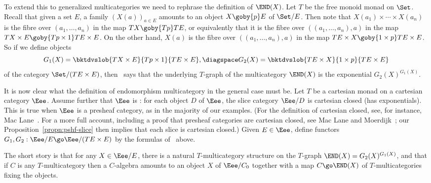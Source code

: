 To extend this to generalized multicategories we need to rephrase the
definition of $\END(X)$.  Let $T$ be the free monoid monad on $\Set$.
Recall that given a set $E$, a family $(X(a))_{a\in E}$ amounts to an
object $X \goby{p} E$ of $\Set/E$.  Then note that $X(a_1)
\times\cdots\times X(a_n)$ is the fibre over $(a_1, \ldots, a_n)$ in the
map $TX \goby{Tp} TE$, or equivalently that it is the fibre over $((a_1,
\ldots, a_n), a)$ in the map $TX \times E \goby{Tp \times 1} TE \times E$.
On the other hand, $X(a)$ is the fibre over $((a_1, \ldots, a_n), a)$ in
the map $TE \times X \goby{1 \times p} TE \times E$.  So if we define
objects
%
\begin{equation}	\label{eq:endo-graphs}
G_1(X) = \bktdvslob{TX \times E}{Tp \times 1}{TE \times E},
\diagspace
G_2(X) = \bktdvslob{TE \times X}{1 \times p}{TE \times E}
\end{equation}
%
of the category $\Set/(TE \times E)$, then~ says that the
underlying $T$-graph of the multicategory $\END(X)$ is the exponential
$G_2(X)^{G_1(X)}$.

It is now clear what the definition of endomorphism%
%
%
%
%
multicategory in the
general case must be.  Let $T$ be a cartesian monad on a cartesian category
$\Eee$.  Assume further that $\Eee$ is :
for each object $D$ of $\Eee$, the slice category $\Eee/D$ is cartesian
closed (has exponentials).  This is true when $\Eee$ is a presheaf
category, as in the majority of our examples.  (For the definition of
cartesian closed, see, for instance, Mac Lane~\cite[IV.6]{MacCWM}.  For a
more full account, including a proof that presheaf categories are cartesian
closed, see Mac Lane and Moerdijk~\cite[I.6]{MM}; our
Proposition~\ref{propn:pshf-slice} then implies that each slice is
cartesian closed.)  Given $E\in\Eee$, define functors $G_1, G_2: \Eee/E \go
\Eee/(TE \times E)$ by the formulas of~ above.  

The short story is that for any $X \in \Eee/E$, there is a natural
$T$-multicategory structure on the $T$-graph $\END(X) = G_2(X)^{G_1(X)}$,%
% 
% 
and that if $C$ is any $T$-multicategory then a $C$-algebra amounts to an
object $X$ of $\Eee/C_0$ together with a map $C \go
\END(X)$ of $T$-multicategories fixing the objects.

